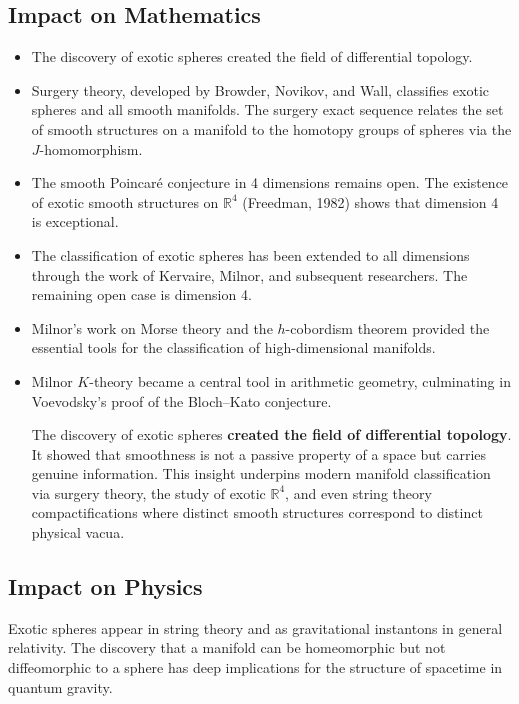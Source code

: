\subsection{Impact on Mathematics}
\begin{itemize}
\item The discovery of exotic spheres created the field of differential topology.
\item Surgery theory, developed by Browder, Novikov, and Wall, classifies exotic spheres and all smooth manifolds. The surgery exact sequence relates the set of smooth structures on a manifold to the homotopy groups of spheres via the $J$-homomorphism.
\item The smooth Poincar\'e conjecture in 4 dimensions remains open. The existence of exotic smooth structures on $\mathbb{R}^4$ (Freedman, 1982) shows that dimension 4 is exceptional.
\item The classification of exotic spheres has been extended to all dimensions through the work of Kervaire, Milnor, and subsequent researchers. The remaining open case is dimension 4.
\item Milnor's work on Morse theory and the $h$-cobordism theorem provided the essential tools for the classification of high-dimensional manifolds.
\item Milnor $K$-theory became a central tool in arithmetic geometry, culminating in Voevodsky's proof of the Bloch--Kato conjecture.

\begin{whyitmatters}
The discovery of exotic spheres \textbf{created the field of differential topology}. It showed that smoothness is not a passive property of a space but carries genuine information. This insight underpins modern manifold classification via surgery theory, the study of exotic $\mathbb{R}^4$, and even string theory compactifications where distinct smooth structures correspond to distinct physical vacua.
\end{whyitmatters}
\end{itemize}

\subsection{Impact on Physics}
Exotic spheres appear in string theory and as gravitational instantons in general relativity. The discovery that a manifold can be homeomorphic but not diffeomorphic to a sphere has deep implications for the structure of spacetime in quantum gravity.

